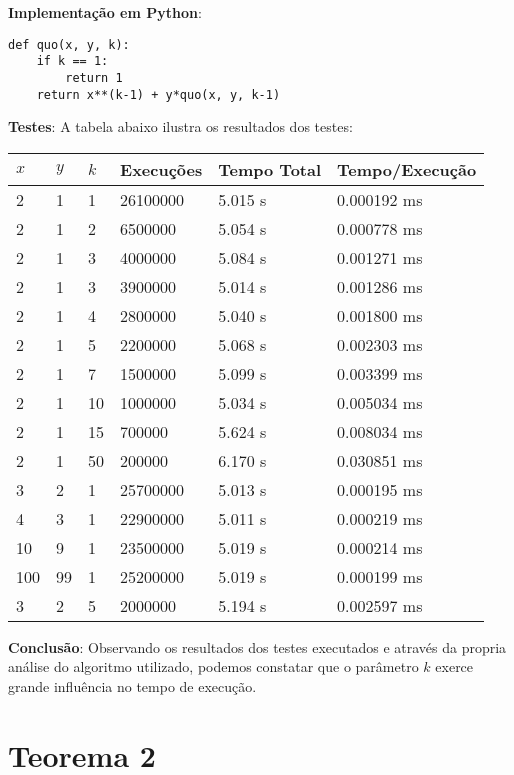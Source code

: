 \textbf{Implementação em Python}:

{\color{red}
\begin{verbatim}
def quo(x, y, k):
    if k == 1:
        return 1
    return x**(k-1) + y*quo(x, y, k-1)
\end{verbatim}
}

\textbf{Testes}: A tabela abaixo ilustra os resultados dos testes:

\begin{table}[H]
\centering
\begin{tabular}{l|l|l|l|l|l}
$x$ & $y$ & $k$ & Execuções & Tempo Total & Tempo/Execução \\\hline
2 & 1 & 1 & 26100000 & 5.015 s & 0.000192 ms \\
2 & 1 & 2 & 6500000 & 5.054 s & 0.000778 ms \\
2 & 1 & 3 & 4000000 & 5.084 s & 0.001271 ms \\
2 & 1 & 3 & 3900000 & 5.014 s & 0.001286 ms \\
2 & 1 & 4 & 2800000 & 5.040 s & 0.001800 ms \\
2 & 1 & 5 & 2200000 & 5.068 s & 0.002303 ms \\
2 & 1 & 7 & 1500000 & 5.099 s & 0.003399 ms \\
2 & 1 & 10 & 1000000 & 5.034 s & 0.005034 ms \\
2 & 1 & 15 & 700000 & 5.624 s & 0.008034 ms \\
2 & 1 & 50 & 200000 & 6.170 s & 0.030851 ms \\
3 & 2 & 1 & 25700000 & 5.013 s & 0.000195 ms \\
4 & 3 & 1 & 22900000 & 5.011 s & 0.000219 ms \\
10 & 9 & 1 & 23500000 & 5.019 s & 0.000214 ms \\
100 & 99 & 1 & 25200000 & 5.019 s & 0.000199 ms \\
3 & 2 & 5 & 2000000 & 5.194 s & 0.002597 ms


\end{tabular}
\end{table}

\textbf{Conclusão}: Observando os resultados dos testes executados e através da propria análise do algoritmo utilizado, podemos constatar que o parâmetro $k$ exerce grande influência no tempo de execução.

\section{Teorema 2}

